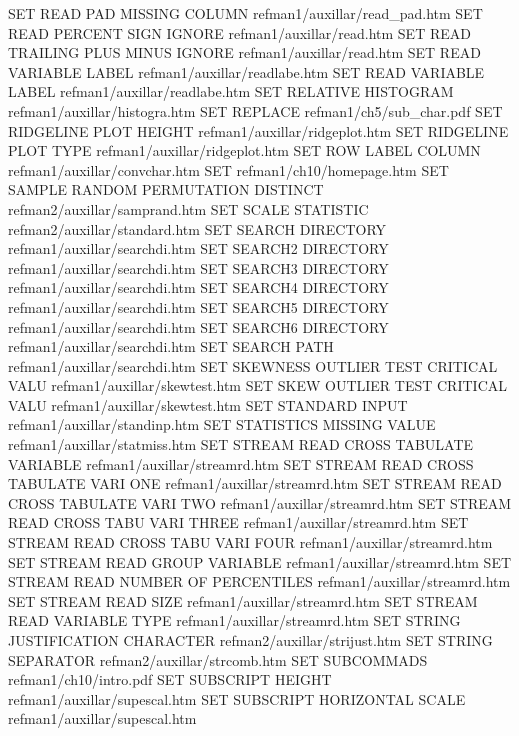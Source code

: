 SET READ PAD MISSING COLUMN             refman1/auxillar/read_pad.htm
SET READ PERCENT SIGN IGNORE            refman1/auxillar/read.htm
SET READ TRAILING PLUS MINUS IGNORE     refman1/auxillar/read.htm
SET READ VARIABLE LABEL                 refman1/auxillar/readlabe.htm
SET READ VARIABLE LABEL                 refman1/auxillar/readlabe.htm
SET RELATIVE HISTOGRAM                  refman1/auxillar/histogra.htm
SET REPLACE                             refman1/ch5/sub_char.pdf
SET RIDGELINE PLOT HEIGHT               refman1/auxillar/ridgeplot.htm
SET RIDGELINE PLOT TYPE                 refman1/auxillar/ridgeplot.htm
SET ROW LABEL COLUMN                    refman1/auxillar/convchar.htm
SET                                     refman1/ch10/homepage.htm
SET SAMPLE RANDOM PERMUTATION DISTINCT  refman2/auxillar/samprand.htm
SET SCALE STATISTIC                     refman2/auxillar/standard.htm
SET SEARCH DIRECTORY                    refman1/auxillar/searchdi.htm
SET SEARCH2 DIRECTORY                   refman1/auxillar/searchdi.htm
SET SEARCH3 DIRECTORY                   refman1/auxillar/searchdi.htm
SET SEARCH4 DIRECTORY                   refman1/auxillar/searchdi.htm
SET SEARCH5 DIRECTORY                   refman1/auxillar/searchdi.htm
SET SEARCH6 DIRECTORY                   refman1/auxillar/searchdi.htm
SET SEARCH PATH                         refman1/auxillar/searchdi.htm
SET SKEWNESS OUTLIER TEST CRITICAL VALU refman1/auxillar/skewtest.htm
SET SKEW     OUTLIER TEST CRITICAL VALU refman1/auxillar/skewtest.htm
SET STANDARD INPUT                      refman1/auxillar/standinp.htm
SET STATISTICS MISSING VALUE            refman1/auxillar/statmiss.htm
SET STREAM READ CROSS TABULATE VARIABLE refman1/auxillar/streamrd.htm
SET STREAM READ CROSS TABULATE VARI ONE refman1/auxillar/streamrd.htm
SET STREAM READ CROSS TABULATE VARI TWO refman1/auxillar/streamrd.htm
SET STREAM READ CROSS TABU VARI THREE   refman1/auxillar/streamrd.htm
SET STREAM READ CROSS TABU VARI FOUR    refman1/auxillar/streamrd.htm
SET STREAM READ GROUP VARIABLE          refman1/auxillar/streamrd.htm
SET STREAM READ NUMBER OF PERCENTILES   refman1/auxillar/streamrd.htm
SET STREAM READ SIZE                    refman1/auxillar/streamrd.htm
SET STREAM READ VARIABLE TYPE           refman1/auxillar/streamrd.htm
SET STRING JUSTIFICATION CHARACTER      refman2/auxillar/strijust.htm
SET STRING SEPARATOR                    refman2/auxillar/strcomb.htm
SET SUBCOMMADS                          refman1/ch10/intro.pdf
SET SUBSCRIPT HEIGHT                    refman1/auxillar/supescal.htm
SET SUBSCRIPT HORIZONTAL SCALE          refman1/auxillar/supescal.htm
